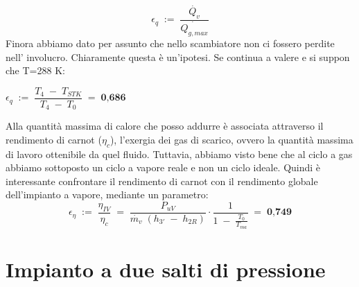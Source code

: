 \documentclass[a4paper, twoside, 12pt]{report}
\begin{document}
\begin{equation}
	\epsilon_{q}\;:=\;\dfrac{\dot{Q_{v}}}{\dot{Q_{g,max}}}
\end{equation}
Finora abbiamo dato per assunto che nello scambiatore non ci fossero perdite nell' involucro. Chiaramente questa è un'ipotesi. Se continua a valere e si suppon che T=288 K:
\begin{center}
	$\epsilon_{q}\;:=\;\dfrac{T_{4}\;-\;T_{STK}}{T_{4}\;-\;T_{0}}\;=\;\textbf{0,686}$
\end{center}
Alla quantità massima di calore che posso addurre è associata attraverso il rendimento di carnot ($\eta_{c}$), l'exergia dei gas di scarico, ovvero la quantità massima di lavoro ottenibile da quel fluido. Tuttavia, abbiamo visto bene che al ciclo a gas abbiamo sottoposto un ciclo a vapore reale e non un ciclo ideale. Quindi è interessante confrontare il rendimento di carnot con il rendimento globale dell'impianto a vapore, mediante un parametro:
\begin{equation}
	\epsilon_{\eta}\;:=\;\dfrac{\eta_{IV}}{\eta_{c}}\;=\;\dfrac{P_{uV}}{\dot{m_{v}}\;(h_{3'}\;-\;h_{2R})}\cdot\dfrac{1}{1\;-\;\frac{T_{0}}{T_{ma}}}\;=\;\textbf{0,749}
\end{equation} 


\section{Impianto a due salti di pressione}
\end{document}
